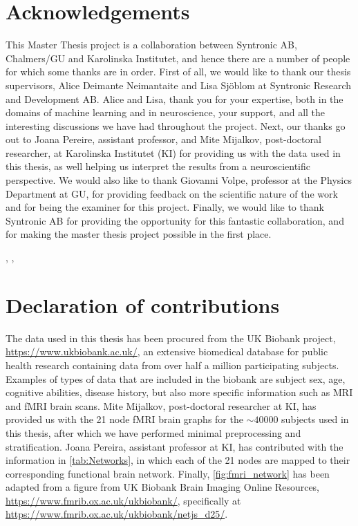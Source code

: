 \thispagestyle{plain}			%
\section*{Acknowledgements}
This Master Thesis project is a collaboration between Syntronic AB, Chalmers/GU and Karolinska Institutet, and hence there are a number of people for which some thanks are in order. First of all, we would like to thank our thesis supervisors, Alice Deimante Neimantaite and Lisa Sjöblom at Syntronic Research and Development AB. Alice and Lisa, thank you for your expertise, both in the domains of machine learning and in neuroscience, your support, and all the interesting discussions we have had throughout the project. Next, our thanks go out to Joana Pereire, assistant professor, and Mite Mijalkov, post-doctoral researcher, at Karolinska Institutet (KI) for providing us with the data used in this thesis, as well helping us interpret the results from a neuroscientific perspective. We would also like to thank Giovanni Volpe, professor at the Physics Department at GU, for providing feedback on the scientific nature of the work and for being the examiner for this project. Finally, we would like to thank Syntronic AB for providing the opportunity for this fantastic collaboration, and for making the master thesis project possible in the first place.

\hfill
\thesisAuthor, \thesisCity, \thesisMonth\ \thesisYear

\section*{Declaration of contributions}
The data used in this thesis has been procured from the UK Biobank project, \url{https://www.ukbiobank.ac.uk/}, an extensive biomedical database for public health research containing data from over half a million participating subjects. Examples of types of data that are included in the biobank are subject sex, age, cognitive abilities, disease history, but also more specific information such as MRI and fMRI brain scans. Mite Mijalkov, post-doctoral researcher at KI, has provided us with the 21 node fMRI brain graphs for the $\sim 40000$ subjects used in this thesis, after which we have performed minimal preprocessing and stratification. Joana Pereira, assistant professor at KI, has contributed with the information in \cref{tab:Networks}, in which each of the 21 nodes are mapped to their corresponding functional brain network. Finally, \cref{fig:fmri_network} has been adapted from a figure from UK Biobank Brain Imaging Online Resources, \url{https://www.fmrib.ox.ac.uk/ukbiobank/}, specifically at \url{https://www.fmrib.ox.ac.uk/ukbiobank/netjs_d25/}. 

\if{}
\newpage				%
\thispagestyle{empty}
\mbox{}
\fi
